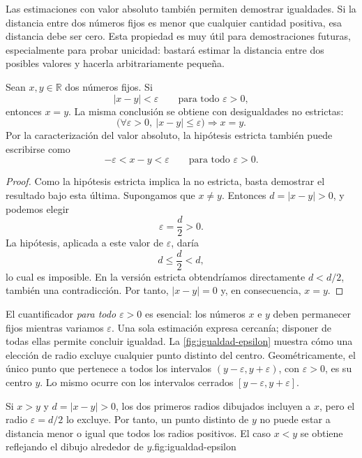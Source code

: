Las estimaciones con valor absoluto también permiten demostrar igualdades. Si la distancia entre dos números fijos es menor que cualquier cantidad positiva, esa distancia debe ser cero. Esta propiedad es muy útil para demostraciones futuras, especialmente para probar unicidad: bastará estimar la distancia entre dos posibles valores y hacerla arbitrariamente pequeña.

\begin{samepage}
\begin{proposition}
\label{prop:igualdad-epsilon}
Sean $x,y\in\mathbb{R}$ dos números fijos. Si
\[
 |x-y|<\varepsilon
 \qquad\text{para todo }\varepsilon>0,
\]
entonces $x=y$. La misma conclusión se obtiene con desigualdades no estrictas:
\[
 \boxed{\bigl(\forall\varepsilon>0,\ |x-y|\leq\varepsilon\bigr)
 \Longrightarrow x=y.}
\]
Por la caracterización del valor absoluto, la hipótesis estricta también puede escribirse como
\[
 -\varepsilon<x-y<\varepsilon
 \qquad\text{para todo }\varepsilon>0.
\]
\end{proposition}
\end{samepage}

\begin{proof}
Como la hipótesis estricta implica la no estricta, basta demostrar el resultado bajo esta última. Supongamos que $x\neq y$. Entonces $d=|x-y|>0$, y podemos elegir
\[
 \varepsilon=\frac d2>0.
\]
La hipótesis, aplicada a este valor de $\varepsilon$, daría
\[
 d\leq\frac d2<d,
\]
lo cual es imposible. En la versión estricta obtendríamos directamente $d<d/2$, también una contradicción. Por tanto, $|x-y|=0$ y, en consecuencia, $x=y$.
\end{proof}

El cuantificador \emph{para todo $\varepsilon>0$} es esencial: los números $x$ e $y$ deben permanecer fijos mientras variamos $\varepsilon$. Una sola estimación expresa cercanía; disponer de todas ellas permite concluir igualdad. La \cref{fig:igualdad-epsilon} muestra cómo una elección de radio excluye cualquier punto distinto del centro. Geométricamente, el único punto que pertenece a todos los intervalos $(y-\varepsilon,y+\varepsilon)$, con $\varepsilon>0$, es su centro $y$. Lo mismo ocurre con los intervalos cerrados $[y-\varepsilon,y+\varepsilon]$.

\begin{figuranotas}{Si $x>y$ y $d=|x-y|>0$, los dos primeros radios dibujados incluyen a $x$, pero el radio $\varepsilon=d/2$ lo excluye. Por tanto, un punto distinto de $y$ no puede estar a distancia menor o igual que todos los radios positivos. El caso $x<y$ se obtiene reflejando el dibujo alrededor de $y$.}{fig:igualdad-epsilon}

\end{figuranotas}

